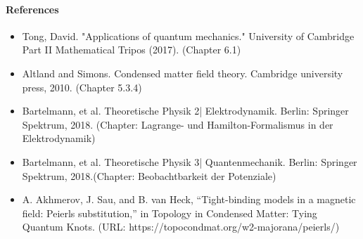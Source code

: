 \documentclass[../../main]{subfiles}
\begin{document}
  

\paragraph{References}
\begin{itemize}
    \item Tong, David. "Applications of quantum mechanics." University of Cambridge Part II Mathematical Tripos (2017). (Chapter 6.1)
    \item Altland and Simons. Condensed matter field theory. Cambridge university press, 2010. (Chapter 5.3.4)
    \item Bartelmann, et al. Theoretische Physik 2| Elektrodynamik. Berlin: Springer Spektrum, 2018. (Chapter: Lagrange- und Hamilton-Formalismus in der Elektrodynamik)
    \item Bartelmann, et al. Theoretische Physik 3| Quantenmechanik. Berlin: Springer Spektrum, 2018.(Chapter: Beobachtbarkeit der Potenziale)
    \item A. Akhmerov, J. Sau, and B. van Heck, “Tight-binding models in a magnetic field: Peierls substitution,” in Topology in Condensed Matter: Tying Quantum Knots. (URL: https://topocondmat.org/w2-majorana/peierls/) 
\end{itemize}
\end{document}
